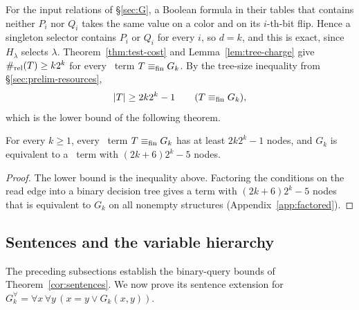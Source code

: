 For the input relations of \S\ref{sec:G}, a Boolean formula in their
tables that contains neither $P_i$ nor $Q_i$ takes the same value on a
color and on its $i$-th-bit flip. Hence a singleton selector contains
$P_i$ or $Q_i$ for every $i$, so $d=k$, and this is exact, since
$H_\lambda$ selects $\lambda$. Theorem~\ref{thm:test-cost} and
Lemma~\ref{lem:tree-charge} give $\#_{\mathrm{rel}}(T)\ge k2^k$ for every \CoR\
term $T\equiv_{\mathrm{fin}} G_k$. By the tree-size inequality from \S\ref{sec:prelim-resources},
\[
 |T|\ge2k2^k-1\qquad(T\equiv_{\mathrm{fin}} G_k),
\]
which is the lower bound of the following theorem.
\begin{theorem}\label{thm:tree}
For every $k\ge1$, every \CoR\ term $T\equiv_{\mathrm{fin}} G_k$ has at least $2k2^k-1$
nodes, and $G_k$ is equivalent to a \CoR\ term with $(2k+6)2^k-5$ nodes.
\end{theorem}
\begin{proof}
The lower bound is the inequality above. Factoring the conditions on the
read edge into a binary decision tree gives a term with $(2k+6)2^k-5$
nodes that is equivalent to $G_k$ on all nonempty structures
(Appendix~\ref{app:factored}).
\end{proof}

\subsection{Sentences and the variable hierarchy}\label{sec:sentences}
The preceding subsections establish the binary-query bounds of
Theorem~\ref{cor:sentences}. We now prove its sentence extension for
$G_k^\forall=\forall x\,\forall y\,(x=y\lor G_k(x,y))$.

\sentencebounds*
